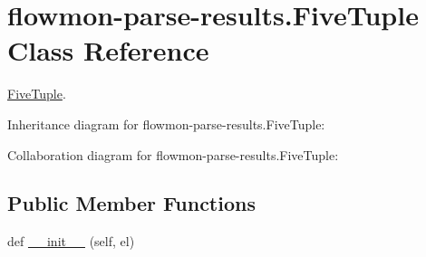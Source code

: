 \hypertarget{classflowmon-parse-results_1_1FiveTuple}{}\section{flowmon-\/parse-\/results.Five\+Tuple Class Reference}
\label{classflowmon-parse-results_1_1FiveTuple}


\hyperlink{classflowmon-parse-results_1_1FiveTuple}{Five\+Tuple}.  




Inheritance diagram for flowmon-\/parse-\/results.Five\+Tuple\+:


Collaboration diagram for flowmon-\/parse-\/results.Five\+Tuple\+:
\subsection*{Public Member Functions}
\begin{DoxyCompactItemize}
\item 
def \hyperlink{classflowmon-parse-results_1_1FiveTuple_a3ca649caaf3ae5f588eca8f7755716c4}{\+\_\+\+\_\+init\+\_\+\+\_\+} (self, el)
\end{DoxyCompactItemize}
